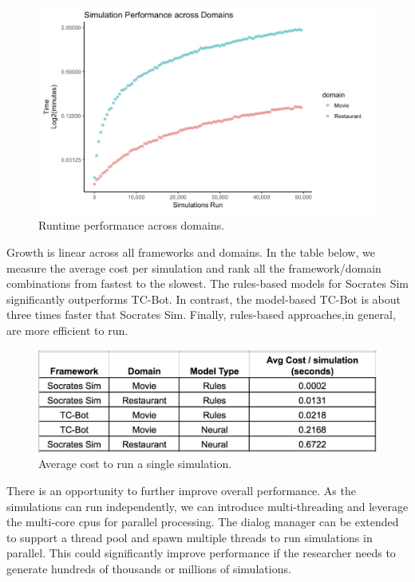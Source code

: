   \begin{figure}[h!]
 	\label{fig:perf_cd_test}
 	\includegraphics[width=\linewidth]{diagrams/domain_perf.jpeg}
 	\caption{ Runtime performance across domains.}
 \end{figure}

Growth is linear across all frameworks and domains. In the table below, we measure the average cost per simulation and rank all the framework/domain combinations from fastest to the slowest. The rules-based models for Socrates Sim significantly outperforms TC-Bot. In contrast, the model-based TC-Bot is about three times faster that Socrates Sim. Finally, rules-based approaches,in general, are more efficient to run. 

\begin{figure}[h!]
	\centering
	\includegraphics[width=\linewidth]{diagrams/avg_cost.jpeg}	
	\caption{ Average cost to run a single simulation.}
	\label{fig:avg_cost}
\end{figure}

 There is an opportunity to further improve overall performance. As the simulations can run independently, we can introduce multi-threading and leverage the multi-core cpus for parallel processing. The dialog manager can be extended to support a thread pool and spawn multiple threads to run simulations in parallel. This could significantly improve performance if the researcher needs to generate hundreds of thousands or millions of simulations.  

